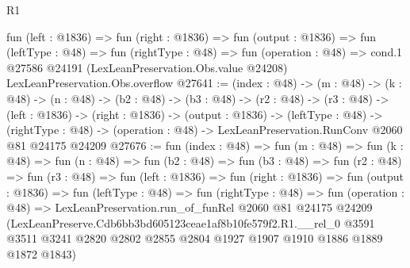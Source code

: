 \begin{lexlean}{R1}
\begin{coremodule}
  fun (left : @1836) =>
  fun (right : @1836) =>
  fun (output : @1836) =>
  fun (leftType : @48) =>
  fun (rightType : @48) =>
  fun (operation : @48) =>
  cond.{1} @27586 @24191 (LexLeanPreservation.Obs.value @24208) LexLeanPreservation.Obs.overflow
@27641 := (index : @48) ->
  (m : @48) ->
  (k : @48) ->
  (n : @48) ->
  (b2 : @48) ->
  (b3 : @48) ->
  (r2 : @48) ->
  (r3 : @48) ->
  (left : @1836) ->
  (right : @1836) ->
  (output : @1836) ->
  (leftType : @48) ->
  (rightType : @48) -> (operation : @48) -> LexLeanPreservation.RunConv @2060 @81 @24175 @24209
@27676 := fun (index : @48) =>
  fun (m : @48) =>
  fun (k : @48) =>
  fun (n : @48) =>
  fun (b2 : @48) =>
  fun (b3 : @48) =>
  fun (r2 : @48) =>
  fun (r3 : @48) =>
  fun (left : @1836) =>
  fun (right : @1836) =>
  fun (output : @1836) =>
  fun (leftType : @48) =>
  fun (rightType : @48) =>
  fun (operation : @48) =>
  LexLeanPreservation.run_of_funRel
    @2060
    @81
    @24175
    @24209
    (LexLeanPreserve.Cdb6bb3bd605123ceae1af8b10fe579f2.R1.__rel_0
      @3591
      @3511
      @3241
      @2820
      @2802
      @2855
      @2804
      @1927
      @1907
      @1910
      @1886
      @1889
      @1872
      @1843)
\end{coremodule}
\end{lexlean}
